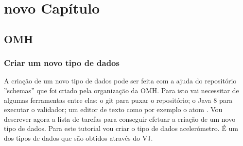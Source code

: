 \documentclass[11pt,twoside,a4paper]{report}
\begin{document}
\chapter{ novo Capítulo}


\section{OMH}

\subsection{Criar um novo tipo de dados}
A criação de um novo tipo de dados pode ser feita com a ajuda do repositório ''schemas'' \cite{schemas-rep} que foi criado pela organização da \gls{OMH}. Para isto vai necessitar de algumas ferramentas entre elas: o git \cite{git-install} para puxar o repositório; o Java 8 \cite{java-overview} para executar o validador; um editor de texto como por exemplo o atom \cite{atom-install}. Vou descrever agora a lista de tarefas para conseguir efetuar a criação de um novo tipo de dados. Para este tutorial vou criar o tipo de dados acelerómetro. É um dos tipos de dados que são obtidos através do \gls{VJ}.
\end{document}
